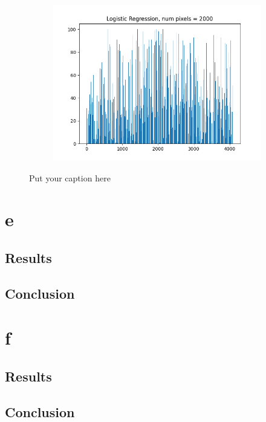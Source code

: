 \documentclass{article}
\begin{document}
\begin{figure}[H]
\begin{subfigure}{.33\textwidth}
  \label{fig:sub-second}
\end{subfigure}
\begin{subfigure}{.33\textwidth}
  \centering
  \includegraphics[width=1\linewidth]{2d/Logistic Regression, 2000.png}  
  
  \label{fig:sub-second}
\end{subfigure}
\caption{Put your caption here}
\label{feet histo 2d}
\end{figure}
\newpage
\section{e}
\subsection{Results}
\subsection{Conclusion}
\newpage
\section{f}
\subsection{Results}
\subsection{Conclusion}
\end{document}
